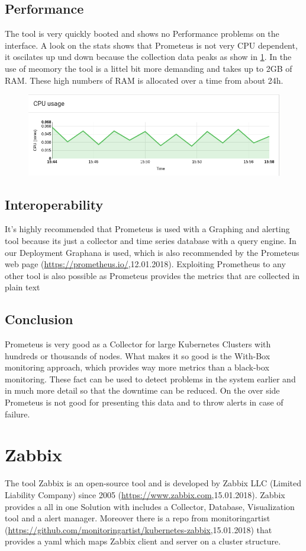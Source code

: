 \subsection{Performance}
The tool is very quickly booted and shows no Performance problems on the interface. A look on the stats shows that Prometeus is not very CPU dependent, it oscilates up und down because the collection data peaks as show in \cref{fig:Prometeus_Cpu}. In the use of meomory the tool is a littel bit more demanding and takes up to 2GB of RAM. These high numbers of RAM is allocated over a time from about 24h. 
\begin{figure}
\centering
\includegraphics[width=0.7\linewidth]{Bilder/Performance/Prometeus_Cpu}
\caption{}
\label{fig:Prometeus_Cpu}
\end{figure}
\subsection{Interoperability}
It's highly recommended that Prometeus is used with a Graphing and alerting tool because its just a collector and time series database with a query engine. In our Deployment Graphana is used, which is also recommended by the Prometeus web page (\url{https://prometheus.io/},12.01.2018). Exploiting Prometheus to any other tool is also possible as Prometeus provides the metrics that are collected in plain text
\subsection{Conclusion}
Prometeus is very good as a Collector for large Kubernetes Clusters with hundreds or thousands of nodes. What makes it so good is the With-Box monitoring approach, which provides way more metrics than a black-box monitoring. These fact can be used to detect problems in the system earlier and in much more detail so that the downtime can be reduced. On the over side Prometeus is not good for presenting this data and to throw alerts in case of failure.

\section{Zabbix}
\label{Zabbix} %
\cite{Hernantes2015}
The tool Zabbix is an open-source tool and is developed by Zabbix LLC (Limited Liability Company) since 2005 (\url{https://www.zabbix.com},15.01.2018). Zabbix provides a all in one Solution with includes a Collector, Database, Visualization tool and a alert manager. Moreover there is a repo from monitoringartist (\url{https://github.com/monitoringartist/kubernetes-zabbix},15.01.2018) that provides a yaml which maps Zabbix client and server on a cluster structure.  
